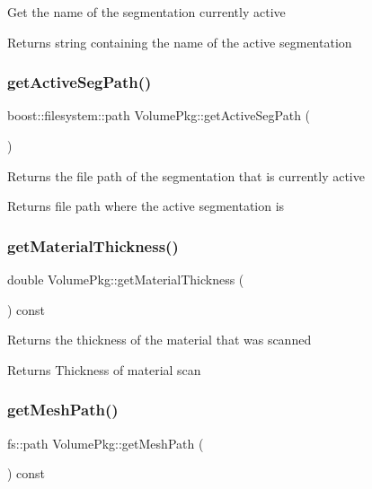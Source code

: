 Get the name of the segmentation currently active \begin{DoxyReturn}{Returns}
string containing the name of the active segmentation 
\end{DoxyReturn}
\hypertarget{classVolumePkg_a7af137a5ab84ca0b945faef2adf2a75f}{}\label{classVolumePkg_a7af137a5ab84ca0b945faef2adf2a75f} 
\subsubsection{\texorpdfstring{get\+Active\+Seg\+Path()}{getActiveSegPath()}}
{\footnotesize\ttfamily boost\+::filesystem\+::path Volume\+Pkg\+::get\+Active\+Seg\+Path (\begin{DoxyParamCaption}{ }\end{DoxyParamCaption})}

Returns the file path of the segmentation that is currently active \begin{DoxyReturn}{Returns}
file path where the active segmentation is 
\end{DoxyReturn}
\hypertarget{classVolumePkg_a84a0f3f538667094dc498124f0eb548c}{}\label{classVolumePkg_a84a0f3f538667094dc498124f0eb548c} 
\subsubsection{\texorpdfstring{get\+Material\+Thickness()}{getMaterialThickness()}}
{\footnotesize\ttfamily double Volume\+Pkg\+::get\+Material\+Thickness (\begin{DoxyParamCaption}{ }\end{DoxyParamCaption}) const}

Returns the thickness of the material that was scanned \begin{DoxyReturn}{Returns}
Thickness of material scan 
\end{DoxyReturn}
\hypertarget{classVolumePkg_a898bdeb06e84c1b2bdebc89b327ba6a7}{}\label{classVolumePkg_a898bdeb06e84c1b2bdebc89b327ba6a7} 
\subsubsection{\texorpdfstring{get\+Mesh\+Path()}{getMeshPath()}}
{\footnotesize\ttfamily fs\+::path Volume\+Pkg\+::get\+Mesh\+Path (\begin{DoxyParamCaption}{ }\end{DoxyParamCaption}) const}


